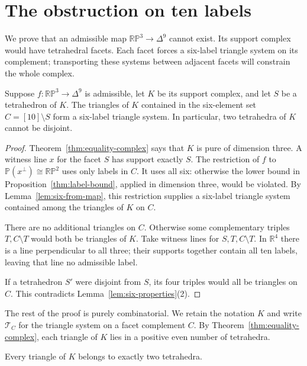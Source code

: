 \section{The obstruction on ten labels}\label{sec:ten-labels}

We prove that an admissible map $\mathbb{RP}^3\to\Delta^9$ cannot exist.
Its support complex would have tetrahedral facets. Each facet forces a
six-label triangle system on its complement; transporting these systems
between adjacent facets will constrain the whole complex.

\begin{lemma}\label{lem:facet-complement}
Suppose $f:\mathbb{RP}^3\to\Delta^9$ is admissible, let $K$ be its support
complex, and let $S$ be a tetrahedron of $K$. The triangles of $K$
contained in the six-element set $C=[10]\setminus S$ form a six-label
triangle system. In particular, two tetrahedra of $K$ cannot be disjoint.
\end{lemma}

\begin{proof}
Theorem~\ref{thm:equality-complex} says that $K$ is pure of
dimension three. A witness line $x$ for the facet $S$ has support exactly
$S$. The restriction of $f$ to $\mathbb P(x^\perp)\cong\mathbb{RP}^2$
uses only labels in $C$. It uses all six: otherwise the lower bound in
Proposition~\ref{thm:label-bound}, applied in dimension three,
would be violated. By Lemma~\ref{lem:six-from-map}, this restriction
supplies a six-label triangle system contained among the triangles of
$K$ on $C$.

There are no additional triangles on $C$. Otherwise some complementary
triples $T,C\setminus T$ would both be triangles of $K$. Take witness
lines for $S,T,C\setminus T$. In $\mathbb R^4$ there is a line
perpendicular to all three; their supports together contain all ten
labels, leaving that line no admissible label.

If a tetrahedron $S'$ were disjoint from $S$, its four triples would all
be triangles on $C$. This contradicts
Lemma~\ref{lem:six-properties}(2).
\end{proof}

The rest of the proof is purely combinatorial. We retain the notation
$K$ and write $\mathcal T_C$ for the triangle system on a facet
complement $C$. By Theorem~\ref{thm:equality-complex}, each
triangle of $K$ lies in a positive even number of tetrahedra.

\begin{lemma}\label{lem:two-tetrahedra}
Every triangle of $K$ belongs to exactly two tetrahedra.
\end{lemma}

